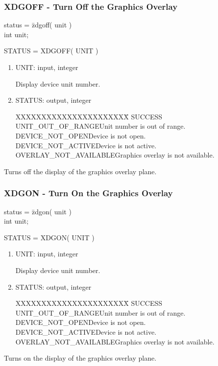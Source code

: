 \subsubsection{XDGOFF - Turn Off the Graphics Overlay}
\begin{tabbing}
status = \=zdgoff( unit )\\
\>int  unit;\\
\end{tabbing}
STATUS = XDGOFF( UNIT )
\begin{enumerate}
\item UNIT:  input, integer

Display device unit number.
\item STATUS:  output, integer
\begin{tabbing}
XXXXXXXXXXXXXXXXXXXXXX\=\kill
SUCCESS\\
UNIT\_OUT\_OF\_RANGE\>Unit number is out of range.\\
DEVICE\_NOT\_OPEN\>Device is not open.\\
DEVICE\_NOT\_ACTIVE\>Device is not active.\\
OVERLAY\_NOT\_AVAILABLE\>Graphics overlay is not available.\\
\end{tabbing}
\end{enumerate}
Turns off the display of the graphics overlay plane.
\newpage
\subsubsection{XDGON - Turn On the Graphics Overlay}
\begin{tabbing}
status = \=zdgon( unit )\\
\>int  unit;\\
\end{tabbing}
STATUS = XDGON( UNIT )
\begin{enumerate}
\item UNIT:  input, integer

Display device unit number.
\item STATUS:  output, integer
\begin{tabbing}
XXXXXXXXXXXXXXXXXXXXXX\=\kill
SUCCESS\\
UNIT\_OUT\_OF\_RANGE\>Unit number is out of range.\\
DEVICE\_NOT\_OPEN\>Device is not open.\\
DEVICE\_NOT\_ACTIVE\>Device is not active.\\
OVERLAY\_NOT\_AVAILABLE\>Graphics overlay is not available.\\
\end{tabbing}
\end{enumerate}
Turns on the display of the graphics overlay plane.
\newpage
